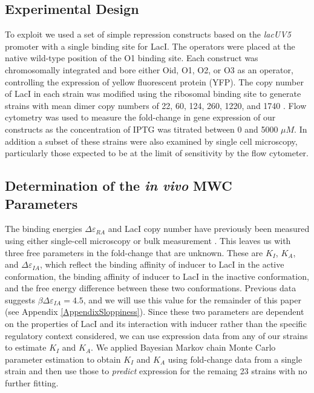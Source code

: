 \pagebreak
\subsection*{Experimental Design}



To exploit \eref[eq7] we used a set of simple repression constructs based on the \textit{lacUV5} promoter with a single binding site for LacI. The operators were placed at the native wild-type position of the O1 binding site. Each construct was chromosomally integrated and bore either Oid, O1, O2, or O3 as an operator, controlling the expression of yellow fluorescent protein (YFP). The copy number of LacI in each strain was modified using the ribosomal binding site to generate strains with mean dimer copy numbers of 22, 60, 124, 260, 1220, and 1740 \cite{Garcia2011}. Flow cytometry was used to measure the fold-change in gene expression of our constructs as the concentration of IPTG was titrated between 0 and 5000 $\mu M$. In addition a subset of these strains were also examined by single cell microscopy, particularly those expected to be at the limit of sensitivity by the flow cytometer.

\subsection*{Determination of the \textit{in vivo} MWC Parameters}

The binding energies $\Delta \varepsilon_{RA}$ and LacI copy number have previously been measured using either single-cell microscopy or bulk measurement \cite{Oehler1994,Vilar2003,Garcia2011, Brewster2014}. This leaves us with three free parameters in the fold-change \eref[eq7] that are unknown. These are $K_I$, $K_A$, and $\Delta\varepsilon_{IA}$, which reflect the binding affinity of inducer to LacI in the active conformation, the binding affinity of inducer to LacI in the inactive conformation, and the free energy difference between these two conformations. Previous data suggests $\beta\Delta\varepsilon_{IA} = 4.5$, and we will use this value for the remainder of this paper (see Appendix \ref{AppendixSloppiness}). Since these two parameters are dependent on the properties of LacI and its interaction with inducer rather than the specific regulatory context considered, we can use expression data from any of our strains to estimate $K_I$ and $K_A$. We applied Bayesian Markov chain Monte Carlo parameter estimation to obtain $K_I$ and $K_A$ using fold-change data from a single strain and then use those to \textit{predict} expression for the remaing 23 strains with no further fitting.

